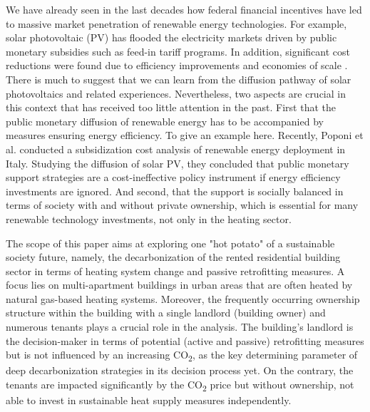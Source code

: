 We have already seen in the last decades how federal financial incentives have led to massive market penetration of renewable energy technologies. For example, solar photovoltaic (PV) has flooded the electricity markets driven by public monetary subsidies such as feed-in tariff programs. In addition, significant cost reductions were found due to efficiency improvements and economies of scale \cite{haas2011historical}. There is much to suggest that we can learn from the diffusion pathway of solar photovoltaics and related experiences. Nevertheless, two aspects are crucial in this context that has received too little attention in the past. First that the public monetary diffusion of renewable energy has to be accompanied by measures ensuring energy efficiency. To give an example here. Recently, Poponi et al. \cite{poponi2021subsidisation} conducted a subsidization cost analysis of renewable energy deployment in Italy. Studying the diffusion of solar PV, they concluded that public monetary support strategies are a cost-ineffective policy instrument if energy efficiency investments are ignored. And second, that the support is socially balanced in terms of society with and without private ownership, which is essential for many renewable technology investments, not only in the heating sector.\vspace{0.5cm}

The scope of this paper aims at exploring one "hot potato" of a sustainable society future, namely, the decarbonization of the rented residential building sector in terms of heating system change and passive retrofitting measures. A focus lies on multi-apartment buildings in urban areas that are often heated by natural gas-based heating systems. Moreover, the frequently occurring ownership structure within the building with a single landlord (building owner) and numerous tenants plays a crucial role in the analysis. The building's landlord is the decision-maker in terms of potential (active and passive) retrofitting measures but is not influenced by an increasing CO\textsubscript{2}, as the key determining parameter of deep decarbonization strategies in its decision process yet. On the contrary, the tenants are impacted significantly by the CO\textsubscript{2} price but without ownership, not able to invest in sustainable heat supply measures independently.\vspace{0.5cm}


